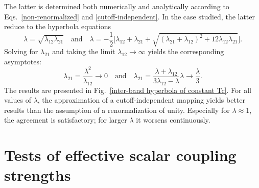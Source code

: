 The latter is determined both numerically and analytically according to
Eqs.~\ref{non-renormalized} and \ref{cutoff-independent}. In the case studied,
the latter reduce to the hyperbola equations
%
\begin{equation*}
    \lambda = \sqrt{\lambda_{1 2} \lambda_{2 1}}
    \quad \text{and} \quad
    \lambda = -\frac 1 2 \Big[ \lambda_{1 2} + \lambda_{2 1} + \sqrt{
        (\lambda_{2 1} + \lambda_{1 2})^2
        + 12 \lambda_{1 2} \lambda_{2 1}
        }
    \Big].
\end{equation*}
%
Solving for $\lambda_{2 1}$ and taking the limit $\lambda_{1 2} \rightarrow
\infty$ yields the corresponding asymptotes:
%
\begin{equation*}
    \lambda_{2 1} = \frac{\lambda^2}{\lambda_{1 2}} \rightarrow 0
    \quad \text{and} \quad
    \lambda_{2 1} = \frac{\lambda + \lambda_{1 2}}{3 \lambda_{1 2} - \lambda}
    \lambda \rightarrow \frac \lambda 3.
\end{equation*}
%
The results are presented in Fig.~\ref{inter-band hyperbola of constant Tc}. For
all values of $\lambda$, the approximation of a cutoff-independent mapping
yields better results than the assumption of a renormalization of unity.
Especially for $\lambda \approx 1$, the agreement is satisfactory; for larger
$\lambda$ it worsens continuously.

\section{Tests of effective scalar coupling strengths}

